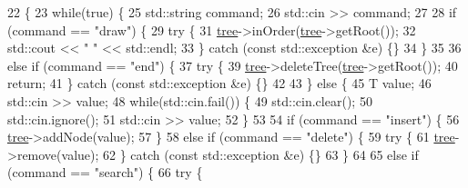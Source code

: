 \begin{DoxyCode}
22                    \{
23             \textcolor{keywordflow}{while}(\textcolor{keyword}{true}) \{
25                 std::string command;
26                 std::cin >> command;
27 
28                 \textcolor{keywordflow}{if} (command == \textcolor{stringliteral}{"draw"}) \{
29                     \textcolor{keywordflow}{try} \{
31                         \hyperlink{classConsolReader_a11228c385559fb0f4379b5f0c4fadef5}{tree}->inOrder(\hyperlink{classConsolReader_a11228c385559fb0f4379b5f0c4fadef5}{tree}->getRoot());
32                         std::cout << \textcolor{stringliteral}{" "} << std::endl;
33                     \} \textcolor{keywordflow}{catch} (\textcolor{keyword}{const} std::exception &e) \{\}
34                 \} 
35 
36                 \textcolor{keywordflow}{else} \textcolor{keywordflow}{if} (command == \textcolor{stringliteral}{"end"}) \{
37                     \textcolor{keywordflow}{try} \{
39                         \hyperlink{classConsolReader_a11228c385559fb0f4379b5f0c4fadef5}{tree}->deleteTree(\hyperlink{classConsolReader_a11228c385559fb0f4379b5f0c4fadef5}{tree}->getRoot());
40                         \textcolor{keywordflow}{return};
41                     \} \textcolor{keywordflow}{catch} (\textcolor{keyword}{const} std::exception &e) \{\}
42 
43                 \} \textcolor{keywordflow}{else} \{
45                     T value;
46                     std::cin >> value;
48                     \textcolor{keywordflow}{while}(std::cin.fail()) \{
49                         std::cin.clear();
50                         std::cin.ignore();
51                         std::cin >> value;
52                     \}
53 
54                     \textcolor{keywordflow}{if} (command == \textcolor{stringliteral}{"insert"}) \{
56                         \hyperlink{classConsolReader_a11228c385559fb0f4379b5f0c4fadef5}{tree}->addNode(value);
57                     \}
58                     \textcolor{keywordflow}{else} \textcolor{keywordflow}{if} (command == \textcolor{stringliteral}{"delete"}) \{
59                         \textcolor{keywordflow}{try} \{
61                             \hyperlink{classConsolReader_a11228c385559fb0f4379b5f0c4fadef5}{tree}->remove(value);
62                         \} \textcolor{keywordflow}{catch} (\textcolor{keyword}{const} std::exception &e) \{\}                    
63                     \}
64 
65                     \textcolor{keywordflow}{else} \textcolor{keywordflow}{if} (command == \textcolor{stringliteral}{"search"}) \{
66                         \textcolor{keywordflow}{try} \{

\end{DoxyCode}
